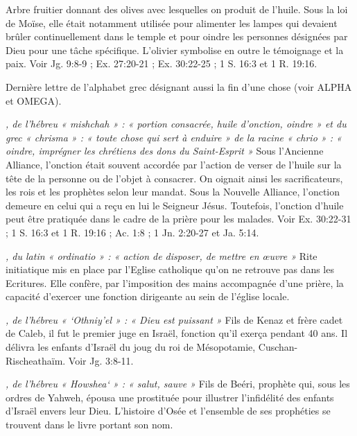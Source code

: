 \begin{multicols}{2}
{\textit{}\newline
Arbre fruitier donnant des olives avec lesquelles on produit de l'huile. Sous la loi de Moïse, elle était notamment utilisée pour alimenter les lampes qui devaient brûler continuellement dans le temple et pour oindre les personnes désignées par Dieu pour une tâche spécifique. L'olivier symbolise en outre le témoignage et la paix. Voir Jg. 9:8-9 ; Ex. 27:20-21 ; Ex. 30:22-25 ; 1 S. 16:3 et 1 R. 19:16.

\textit{}\newline
Dernière lettre de l'alphabet grec désignant aussi la fin d'une chose (voir ALPHA et OMEGA).

\textit{, de l'hébreu « mishchah » : « portion consacrée, huile d'onction, oindre » et du grec « chrisma » : « toute chose qui sert à enduire » de la racine « chrio » : « oindre, imprégner les chrétiens des dons du Saint-Esprit »}\newline
Sous l'Ancienne Alliance, l'onction était souvent accordée par l'action de verser de l'huile sur la tête de la personne ou de l'objet à consacrer. On oignait ainsi les sacrificateurs, les rois et les prophètes selon leur mandat. Sous la Nouvelle Alliance, l'onction demeure en celui qui a reçu en lui le Seigneur Jésus. Toutefois, l'onction d'huile peut être pratiquée dans le cadre de la prière pour les malades. Voir Ex. 30:22-31 ; 1 S. 16:3 et 1 R. 19:16 ; Ac. 1:8 ; 1 Jn. 2:20-27 et Ja. 5:14.

\textit{, du latin « ordinatio » : « action de disposer, de mettre en œuvre »}\newline
Rite initiatique mis en place par l'Eglise catholique qu'on ne retrouve pas dans les Ecritures. Elle confère, par l'imposition des mains accompagnée d'une prière, la capacité d'exercer une fonction dirigeante au sein de l'église locale.

\textit{, de l'hébreu « `Othniy'el » : « Dieu est puissant »}\newline
Fils de Kenaz et frère cadet de Caleb, il fut le premier juge en Israël, fonction qu'il exerça pendant 40 ans. Il délivra les enfants d'Israël du joug du roi de Mésopotamie, Cuschan-Rischeathaïm. Voir Jg. 3:8-11.

\textit{, de l'hébreu « Howshea` » : « salut, sauve »}\newline
Fils de Beéri, prophète qui, sous les ordres de Yahweh, épousa une prostituée pour illustrer l'infidélité des enfants d'Israël envers leur Dieu. L'histoire d'Osée et l'ensemble de ses prophéties se trouvent dans le livre portant son nom.

}
\end{multicols}
